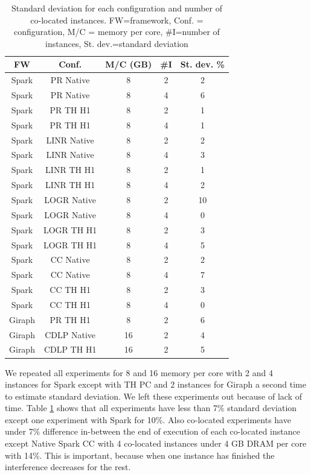 \begin{table}[thbp]
  \centering
  \caption{Standard deviation for each configuration and number of co-located instances.
        FW=framework, Conf. = configuration, M/C = memory per core, #I=number of instances, St. dev.=standard deviation}
  \label{tab:std-dev}
  \begin{tabular}{|c|c|c|c|c|}
    \hline
          \textbf{FW} & \textbf{Conf.} & \textbf{M/C (GB)} & \textbf{\#I} & \textbf{St. dev. \%} \\
    \hline
          Spark & PR Native & 8 & 2 & 2\\
          Spark & PR Native & 8 & 4 & 6\\
          Spark & PR TH H1 & 8 & 2 & 1 \\
          Spark & PR TH H1 & 8 & 4 & 1 \\
          Spark & LINR Native & 8 & 2 & 2 \\
          Spark & LINR Native & 8 & 4 & 3 \\
          Spark & LINR TH H1 & 8 & 2 & 1 \\
          Spark & LINR TH H1 & 8 & 4 & 2 \\
          Spark & LOGR Native & 8 & 2 & 10 \\
          Spark & LOGR Native & 8 & 4 & 0 \\
          Spark & LOGR TH H1 & 8 & 2 & 3 \\
          Spark & LOGR TH H1 & 8 & 4 & 5 \\
          Spark & CC Native & 8 & 2 & 2 \\
          Spark & CC Native & 8 & 4 & 7 \\
          Spark & CC TH H1 & 8 & 2 & 3 \\
          Spark & CC TH H1 & 8 & 4 & 0 \\
          Giraph & PR TH H1 & 8 & 2 & 6 \\
          Giraph & CDLP Native & 16 & 2 & 4 \\
          Giraph & CDLP TH H1 & 16 & 2 & 5 \\
    \hline
  \end{tabular}
\end{table}

We repeated all experiments for 8 and 16 memory per core with 2 and 4 instances for Spark except with TH PC and 2 instances for Giraph a second time to estimate standard deviation. We left these experiments out because of lack of time. Table \ref{tab:std-dev} shows that 
all experiments have less than 7\% standard deviation except one experiment with Spark for 10\%. Also co-located experiments have under 7\% difference in-between the end of execution of each co-located instance except Native Spark CC with 4 co-located instances under 4 GB DRAM per core with 14\%. This is important, because when one instance has finished the interference decreases for the rest.

